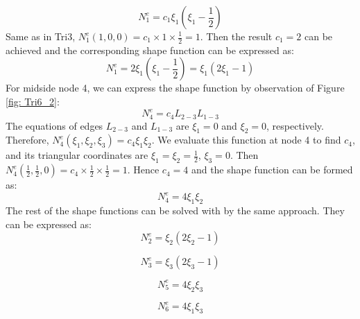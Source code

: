 \begin{equation}
N_1^e = c_1\xi_1 \left(\xi_1 - \frac{1}{2}\right)
\end{equation}
Same as in Tri3, $N_1^e\left(1,0,0\right) = c_1 \times 1 \times \frac{1}{2} = 1$. Then the result $c_1 = 2$ can be achieved and the corresponding shape function can be expressed as: 
\begin{equation}
N_1^e = 2\xi_1\left(\xi_1 - \frac{1}{2}\right) = \xi_1 \left(2 \xi_1 -1 \right)
\end{equation} 
For midside node 4, we can express the shape function by observation of Figure \ref{fig: Tri6_2}:
\begin{equation}
N_4^e = c_4L_{2-3}L_{1-3}
\end{equation}
The equations of edges $L_{2-3}$ and $L_{1-3}$ are $\xi_1 = 0$ and $\xi_2 = 0$, respectively. Therefore, $N_4^e\left(\xi_1, \xi_2, \xi_3\right) = c_4\xi_1\xi_2$. We evaluate this function at node 4 to find $c_4$, and its triangular coordinates are $\xi_1 = \xi_2 = \frac{1}{2}$, $\xi_3 = 0$. Then $N_4^e\left(\frac{1}{2}, \frac{1}{2}, 0\right) = c_4 \times \frac{1}{2} \times \frac{1}{2} = 1$. Hence $c_4 = 4$ and the shape function can be formed as:
\begin{equation}
N_4^e = 4\xi_1\xi_2
\end{equation}
The rest of the shape functions can be solved with by the same approach. They can be expressed as:
\begin{equation}
N_2^e = \xi_2\left(2\xi_2-1\right)
\end{equation}

\begin{equation}
N_3^e = \xi_3\left(2\xi_3-1\right)
\end{equation}

\begin{equation}
N_5^e = 4\xi_2 \xi_3
\end{equation}

\begin{equation}
N_6^e = 4\xi_1 \xi_3
\end{equation}

